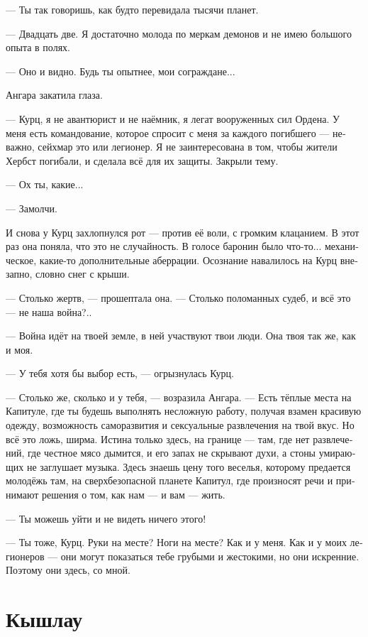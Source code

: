 \documentclass[a4paper,12pt,fleqn]{book}\usepackage{cooltooltips}\usepackage{polyglossia}\setdefaultlanguage[babelshorthands=true]{russian}\setotherlanguage{english}\defaultfontfeatures{Ligatures=TeX,Mapping=tex-text} \usepackage{xcolor}\definecolor{lightgray}{HTML}{bbbbbb}\color{lightgray}\newcommand{\ml}[3]{\textenglish{\textcolor{black}{#3}}}
\begin{document}
--- Ты так говоришь, как будто перевидала тысячи планет.

--- Двадцать две.
Я достаточно молода по меркам демонов и не имею большого опыта в полях.

--- Оно и видно.
Будь ты опытнее, мои сограждане...

Ангара закатила глаза.

--- Курц, я не авантюрист и не наёмник, я легат вооруженных сил Ордена.
У меня есть командование, которое спросит с меня за каждого погибшего --- неважно, сейхмар это или легионер.
Я не заинтересована в том, чтобы жители Хербст погибали, и сделала всё для их защиты.
Закрыли тему.

--- Ох ты, какие...

--- Замолчи.

И снова у Курц захлопнулся рот --- против её воли, с громким клацанием.
В этот раз она поняла, что это не случайность.
В голосе баронин было что-то... механическое, какие-то дополнительные аберрации.
Осознание навалилось на Курц внезапно, словно снег с крыши.

--- Столько жертв, --- прошептала она.
--- Столько поломанных судеб, и всё это --- не наша война?..

--- Война идёт на твоей земле, в ней участвуют твои люди.
Она твоя так же, как и моя.

--- У тебя хотя бы выбор есть, --- огрызнулась Курц.

--- Столько же, сколько и у тебя, --- возразила Ангара.
--- Есть тёплые места на Капитуле, где ты будешь выполнять несложную работу, получая взамен красивую одежду, возможность саморазвития и сексуальные развлечения на твой вкус.
Но всё это ложь, ширма.
Истина только здесь, на границе --- там, где нет развлечений, где честное мясо дымится, и его запах не скрывают духи, а стоны умирающих не заглушает музыка.
Здесь знаешь цену того веселья, которому предается молодёжь там, на сверхбезопасной планете Капитул, где произносят речи и принимают решения о том, как нам --- и вам --- жить.

--- Ты можешь уйти и не видеть ничего этого!

--- Ты тоже, Курц.
Руки на месте?
Ноги на месте?
Как и у меня.
Как и у моих легионеров --- они могут показаться тебе грубыми и жестокими, но они искренние.
Поэтому они здесь, со мной.

\section{Кышлау}
\end{document}
